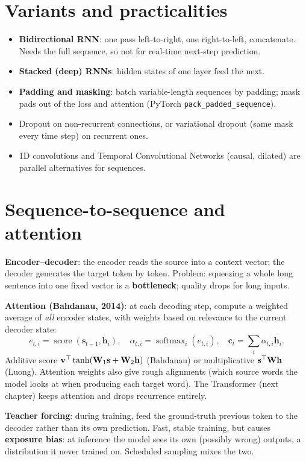 \section{Variants and practicalities}
\begin{itemize}
  \item \textbf{Bidirectional RNN}: one pass left-to-right, one right-to-left, concatenate. Needs the full sequence, so not for real-time next-step prediction.
  \item \textbf{Stacked (deep) RNNs}: hidden states of one layer feed the next.
  \item \textbf{Padding and masking}: batch variable-length sequences by padding; mask pads out of the loss and attention (PyTorch \texttt{pack\_padded\_sequence}).
  \item Dropout on non-recurrent connections, or variational dropout (same mask every time step) on recurrent ones.
  \item 1D convolutions and Temporal Convolutional Networks (causal, dilated) are parallel alternatives for sequences.
\end{itemize}

\section{Sequence-to-sequence and attention}
\textbf{Encoder--decoder}: the encoder reads the source into a context vector; the decoder generates the target token by token. Problem: squeezing a whole long sentence into one fixed vector is a \textbf{bottleneck}; quality drops for long inputs.

\textbf{Attention (Bahdanau, 2014)}: at each decoding step, compute a weighted average of \emph{all} encoder states, with weights based on relevance to the current decoder state:
\[e_{t,i}=\operatorname{score}(\mathbf{s}_{t-1},\mathbf{h}_i),\quad\alpha_{t,i}=\operatorname{softmax}_i(e_{t,i}),\quad\mathbf{c}_t=\sum_i\alpha_{t,i}\mathbf{h}_i.\]
Additive score $\mathbf{v}^\top\tanh(\mathbf{W}_1\mathbf{s}+\mathbf{W}_2\mathbf{h})$ (Bahdanau) or multiplicative $\mathbf{s}^\top\mathbf{W}\mathbf{h}$ (Luong). Attention weights also give rough alignments (which source words the model looks at when producing each target word). The Transformer (next chapter) keeps attention and drops recurrence entirely.

\textbf{Teacher forcing}: during training, feed the ground-truth previous token to the decoder rather than its own prediction. Fast, stable training, but causes \textbf{exposure bias}: at inference the model sees its own (possibly wrong) outputs, a distribution it never trained on. Scheduled sampling mixes the two.

